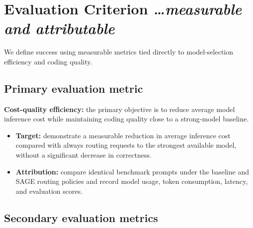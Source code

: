 \documentclass[11pt,a4paper]{article}
\newcommand{\BvrHint}[1]{%
  {\normalfont\normalsize\itshape\hfill #1}%
}
\begin{document}
\section{Evaluation Criterion%
  \texorpdfstring{\BvrHint{\ldots measurable and attributable}}{}}

We define success using measurable metrics tied directly to
model-selection efficiency and coding quality.

\subsection{Primary evaluation metric}

\textbf{Cost-quality efficiency:} the primary objective is to
reduce average model inference cost while maintaining coding
quality close to a strong-model baseline.

\begin{itemize}[leftmargin=0.7cm]

    \item \textbf{Target:} demonstrate a measurable reduction
    in average inference cost compared with always routing
    requests to the strongest available model, without a
    significant decrease in correctness.

    \item \textbf{Attribution:} compare identical benchmark
    prompts under the baseline and SAGE routing policies and
    record model usage, token consumption, latency, and
    evaluation scores.

\end{itemize}

\subsection{Secondary evaluation metrics}
\end{document}
